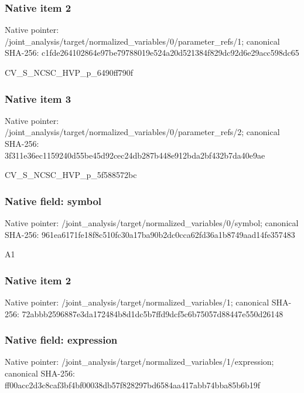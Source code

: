 \documentclass[10pt,a4paper]{article}
\begin{document}
\subsubsection{Native item 2}
Native pointer: /joint\_\allowbreak{}analysis/target/normalized\_\allowbreak{}variables/0/parameter\_\allowbreak{}refs/1; canonical SHA-256: c1fde264102864e97be79788019e524a20d521384f829dc92d6e29acc598dc65

\begingroup\raggedright\sloppy CV\_\allowbreak{}S\_\allowbreak{}NCSC\_\allowbreak{}HVP\_\allowbreak{}p\_\allowbreak{}6490ff790f\par\endgroup

\subsubsection{Native item 3}
Native pointer: /joint\_\allowbreak{}analysis/target/normalized\_\allowbreak{}variables/0/parameter\_\allowbreak{}refs/2; canonical SHA-256: 3f311e36ec1159240d55be45d92cec24db287b448e912bda2bf432b7da40e9ae

\begingroup\raggedright\sloppy CV\_\allowbreak{}S\_\allowbreak{}NCSC\_\allowbreak{}HVP\_\allowbreak{}p\_\allowbreak{}5f588572bc\par\endgroup

\subsubsection{Native field: symbol}
Native pointer: /joint\_\allowbreak{}analysis/target/normalized\_\allowbreak{}variables/0/symbol; canonical SHA-256: 961ea6171fe18f8c510fc30a17ba90b2dc0cca62fd36a1b8749aad14fe357483

\begingroup\raggedright\sloppy A1\par\endgroup

\subsubsection{Native item 2}
Native pointer: /joint\_\allowbreak{}analysis/target/normalized\_\allowbreak{}variables/1; canonical SHA-256: 72abbb2596887e3da172484b8d1dc5b7ffd9dcf5c6b75057d88447e550d26148

\subsubsection{Native field: expression}
Native pointer: /joint\_\allowbreak{}analysis/target/normalized\_\allowbreak{}variables/1/expression; canonical SHA-256: ff00acc2d3c8caf3bf4bf00038db57f828297bd6584aa417abb74bba85b6b19f
\end{document}
